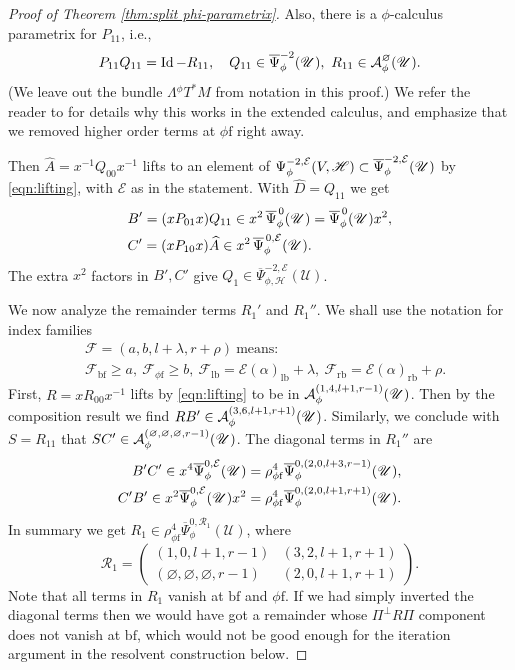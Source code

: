\documentclass[11pt]{article}
\newcommand{\ie}{i.e.,\xspace}
\numberwithin{equation}{section}
\theoremstyle{plain}
\theoremstyle{definition}
\newcommand{\Umath}{{\mathscr{U}}}
\newcommand\calA{{\mathcal A}}
\newcommand\calE{{\mathcal E}}
\newcommand\calF{{\mathcal F}}
\newcommand{\calH}{{\mathscr{H}}}
\newcommand\calR{{\mathcal R}}
\newcommand{\phif}{{\phi\mathrm{f}}}
\newcommand{\lf}{{\mathrm{lb}}}
\newcommand{\rf}{{\mathrm{rb}}}
\newcommand{\bbf}{{\mathrm{bf}}}
\DeclareMathOperator{\Id}{Id}
\newcommand{\Piperp}{\Pi^\perp}
\newcommand{\Psibar}{\overline{\Psi}}
\begin{document}
\begin{proof}[Proof of Theorem \ref{thm:split phi-parametrix}]
Also, there is a $\phi$-calculus parametrix for $P_{11}$, \ie \begin{equation}
\label{eqn:Q11 R11}
P_{11}Q_{11}=\Id - R_{11},\quad
Q_{11}\in\Psibar^{-2}_\phi(\U),\ R_{11}\in \calA^{\varnothing}_{\phi} (\U).
\end{equation}
(We leave out the bundle $\Lambda {}^\phi T^*M$ from notation in this proof.)
We refer the reader to \cite[Prop.\,2]{grieser-para} for details why this works in the extended calculus,
and emphasize that we removed higher order terms at $\phif$ right away.

Then $\widehat{A}=x^{-1}Q_{00}x^{-1}$ lifts to an element of $\Psi_\phi^{-2,\calE}(V,\calH)\subset\Psibar_\phi^{-2,\calE}(\U)$
by \eqref{eqn:lifting}, with $\calE$ as in the statement. With $\widehat{D}=Q_{11}$ we get
\begin{align*}
&B'=(xP_{01}x) Q_{11}\in x^2\,\Psibar^{\,0}_\phi(\U)=\Psibar^{\,0}_\phi(\U) x^2, \\
&C'=(xP_{10}x) \widehat{A} \in x^2\,\Psibar_\phi^{\,0,\calE}(\U).
\end{align*}
The extra $x^2$ factors in $B',C'$ give $Q_1\in \Psibar_{\phi, \mathscr{H}}^{-2,\calE}(\Umath)$.

We now analyze the remainder terms $R_1'$ and $R_1''$.
We shall use the notation for index families
\begin{equation}
\label{eqn:index set tuples}
\begin{split}
&\calF = (a,b,l+\lambda,r+\rho) \ \text{means:}\\
&\calF_\bbf\geq a,\ \calF_\phif\geq b,\ \calF_\lf=\calE(\alpha)_\lf+\lambda,\ \calF_\rf=\calE(\alpha)_\rf+\rho.
\end{split}
\end{equation}
First, $R=xR_{00}x^{-1}$ lifts by \eqref{eqn:lifting}
to be in $\calA_{\phi}^{(1,4,l+1,r-1)}(\U)$. Then by the composition result
\cite[Th.\,9]{grieser-para} we find $RB' \in \calA_{\phi}^{(3,6,l+1,r+1)}(\U)$.
Similarly, we conclude with $S=R_{11}$ that $SC'\in \calA_{\phi}^{(\varnothing,\varnothing,\varnothing,r-1)}(\U)$.
The diagonal terms in $R_1''$ are
\begin{align*}
B'C'\in x^4\Psibar_\phi^{0,\calE}(\U)
&=\rho_\phif^4 \Psibar_\phi^{0,(2,0,l+3,r-1)}(\U), \\
C'B'\in x^2\Psibar_\phi^{0,\calE} (\U)x^2
&=\rho_\phif^4\Psibar_\phi^{0,(2,0,l+1,r+1)}(\U).
\end{align*}
In summary we get $R_1 \in \rho_\phif^4\Psibar_\phi^{0,\calR_1}(\Umath)$, where
\begin{equation}
\label{eqn:phi-param R1}
\calR_1 =
\begin{pmatrix}
(1,0,l+1,r-1) & (3,2,l+1,r+1) \\
(\varnothing,\varnothing,\varnothing,r-1) & (2,0,l+1,r+1)
\end{pmatrix}.
\end{equation}
Note that all terms in $R_1$ vanish at $\bbf$ and $\phif$. If we had simply inverted the
diagonal terms then we would have got a remainder whose $\Piperp R\Pi$ component
does not vanish at $\bbf$, which would not be good enough for the
iteration argument in the resolvent construction below.


\end{proof}
\end{document}

